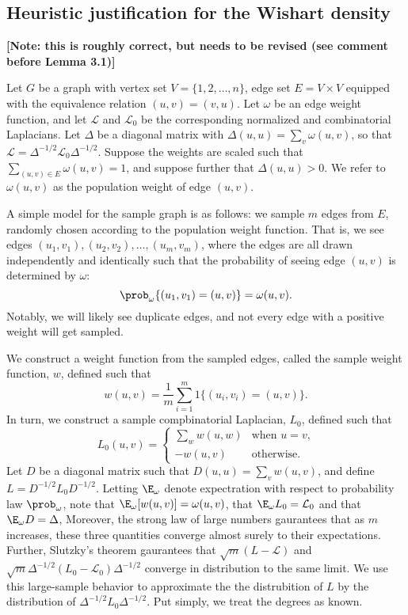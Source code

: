 
\subsection{Heuristic justification for the Wishart density}

\textbf{[Note: this is roughly correct, but needs to be revised (see
  comment before Lemma 3.1)]}

Let $G$ be a graph with vertex set $V = \{ 1, 2, \dotsc, n \}$, edge
set $E = V \times V$ equipped with the equivalence relation
$(u,v) = (v,u)$.  Let $\omega$ be an edge weight function, and let
$\mathcal{L}$ and $\mathcal{L}_0$ be the corresponding normalized and
combinatorial Laplacians.  Let $\Delta$ be a diagonal matrix with
$\Delta(u,u) = \sum_{v} \omega(u,v)$, so that
$\mathcal{L} = \Delta^{-1/2} \mathcal{L}_0 \Delta^{-1/2}$.  Suppose
the weights are scaled such that $\sum_{(u,v) \in E} \omega(u,v) = 1$,
and suppose further that $\Delta(u,u) > 0$.
We refer to $\omega(u,v)$ as the population weight of edge $(u,v)$.

A simple model for the sample graph is as follows: we sample $m$ edges
from $E$, randomly chosen according to the population weight function.
That is, we see edges $(u_1, v_1), (u_2, v_2), \dotsc, (u_m, v_m)$,
where the edges are all drawn independently and identically such that
the probability of seeing edge $(u,v)$ is determined by $\omega$:
\[
  \prob_\omega\{ (u_1, v_1) = (u,v) \} = \omega(u,v).
\]
Notably, we will likely see duplicate edges, and not every edge with a
positive weight will get sampled.

We construct a weight function from the sampled edges, called the
sample weight function, $w$, defined such that
\[
  w(u,v) = \frac{1}{m} \sum_{i=1}^{m} 1\{ (u_i, v_i) = (u,v) \}.
\]
In turn, we construct a sample compbinatorial Laplacian, $L_0$,
defined such that
\[
  L_0(u,v)
    =
    \begin{cases}
      \sum_{w} w(u,w) &\text{when $u = v$,} \\
      -w(u,v) &\text{otherwise.}
    \end{cases}
\]
Let $D$ be a diagonal matrix such that
$D(u,u) = \sum_{v} w(u,v)$, and define $L = D^{-1/2} L_0 D^{-1/2}$.
Letting $\E_\omega$ denote expectration with respect to probability
law $\prob_\omega$, note that $\E_\omega[w(u,v)] = \omega(u,v)$,
that $\E_\omega L_0 = \mathcal{L}_0$ and that $\E_\omega D = \Delta$,
Moreover, the strong law of large numbers gaurantees that as $m$ increases,
these three quantities converge almost surely to their expectations.
Further, Slutzky's theorem gaurantees that $\sqrt{m} (L - \mathcal{L})$ and
$\sqrt{m} \Delta^{-1/2} (L_0 - \mathcal{L}_0) \Delta^{-1/2}$ converge in
distribution to the same limit.  We use this large-sample behavior to
approximate the the distrubition of $L$ by the distribution of
$\Delta^{-1/2} L_0 \Delta^{-1/2}$.  Put simply, we treat the degrees as known.


